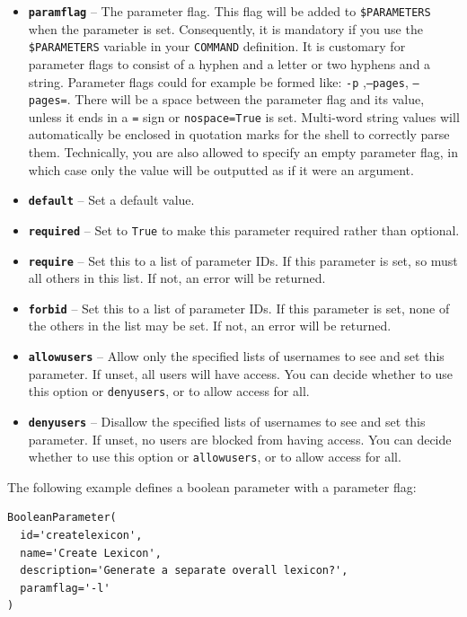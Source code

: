\documentclass[a4paper,12pt,twoside,openright]{report}
\begin{document}
\begin{itemize}
\item \textbf{\texttt{paramflag}} -- The parameter flag. This flag will be
  added to \texttt{\$PARAMETERS} when the parameter is set. Consequently, it is
  mandatory if you use the \texttt{\$PARAMETERS} variable in your
  \texttt{COMMAND} definition. It is customary for parameter flags to consist
  of a hyphen and a letter or two hyphens and a string. Parameter flags could
  for example be formed like: \texttt{-p} ,\texttt{--pages},
  \texttt{--pages=}. There will be a space between the parameter flag and its
  value, unless it ends in a \texttt{=} sign or \texttt{nospace=True} is set.
  Multi-word string values will automatically be enclosed in quotation marks
  for the shell to correctly parse them. Technically, you are also allowed to
  specify an empty parameter flag, in which case only the value will be
  outputted as if it were an argument.
\item \textbf{\texttt{default}} -- Set a default value.
\item \textbf{\texttt{required}} -- Set to \texttt{True} to make this parameter required rather than optional.
\item \textbf{\texttt{require}} -- Set this to a list of parameter IDs. If this parameter is set, so must all others in this list. If not, an error will be returned.
\item \textbf{\texttt{forbid}} -- Set this to a list of parameter IDs. If this parameter is set, none of the others in the list may be set.  If not, an error will be returned.
\item \textbf{\texttt{allowusers}} -- Allow only the specified lists of usernames to see and set this parameter. If unset, all users will have access. You can decide whether to use this option or \texttt{denyusers}, or to allow access for all.
\item \textbf{\texttt{denyusers}} -- Disallow the specified lists of usernames to see and set this parameter. If unset, no users are blocked from having access. You can decide whether to use this option or \texttt{allowusers}, or to allow access for all.
\end{itemize}

The following example defines a boolean parameter with a parameter flag:

{\small
\begin{verbatim}
BooleanParameter(
  id='createlexicon',
  name='Create Lexicon',
  description='Generate a separate overall lexicon?',
  paramflag='-l'
)
\end{verbatim}
}
\end{document}
